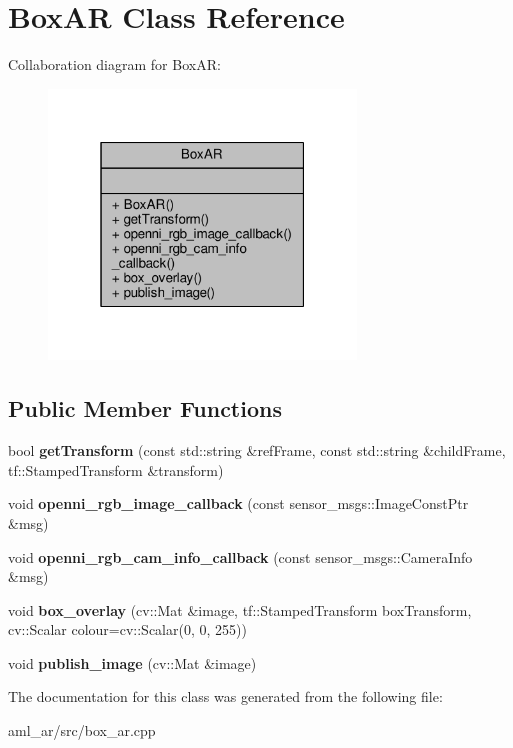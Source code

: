 \hypertarget{class_box_a_r}{\section{Box\-A\-R Class Reference}
\label{class_box_a_r}
}


Collaboration diagram for Box\-A\-R\-:
\nopagebreak
\begin{figure}[H]
\begin{center}
\leavevmode
\includegraphics[width=232pt]{class_box_a_r__coll__graph}
\end{center}
\end{figure}
\subsection*{Public Member Functions}
\begin{DoxyCompactItemize}
\item 
\hypertarget{class_box_a_r_a083a9842bff7362e1aaf1d553e490094}{bool {\bfseries get\-Transform} (const std\-::string \&ref\-Frame, const std\-::string \&child\-Frame, tf\-::\-Stamped\-Transform \&transform)}\label{class_box_a_r_a083a9842bff7362e1aaf1d553e490094}

\item 
\hypertarget{class_box_a_r_a366e98d7ec10627fd973228cc7c0c77d}{void {\bfseries openni\-\_\-rgb\-\_\-image\-\_\-callback} (const sensor\-\_\-msgs\-::\-Image\-Const\-Ptr \&msg)}\label{class_box_a_r_a366e98d7ec10627fd973228cc7c0c77d}

\item 
\hypertarget{class_box_a_r_a2f8307914c1f75d113e76cd4c80c4fe2}{void {\bfseries openni\-\_\-rgb\-\_\-cam\-\_\-info\-\_\-callback} (const sensor\-\_\-msgs\-::\-Camera\-Info \&msg)}\label{class_box_a_r_a2f8307914c1f75d113e76cd4c80c4fe2}

\item 
\hypertarget{class_box_a_r_a4b87723540c75deee10727981e1ea42b}{void {\bfseries box\-\_\-overlay} (cv\-::\-Mat \&image, tf\-::\-Stamped\-Transform box\-Transform, cv\-::\-Scalar colour=cv\-::\-Scalar(0, 0, 255))}\label{class_box_a_r_a4b87723540c75deee10727981e1ea42b}

\item 
\hypertarget{class_box_a_r_a38766d12db36b96f9fc40a9624129a30}{void {\bfseries publish\-\_\-image} (cv\-::\-Mat \&image)}\label{class_box_a_r_a38766d12db36b96f9fc40a9624129a30}

\end{DoxyCompactItemize}


The documentation for this class was generated from the following file\-:\begin{DoxyCompactItemize}
\item 
aml\-\_\-ar/src/box\-\_\-ar.\-cpp\end{DoxyCompactItemize}
